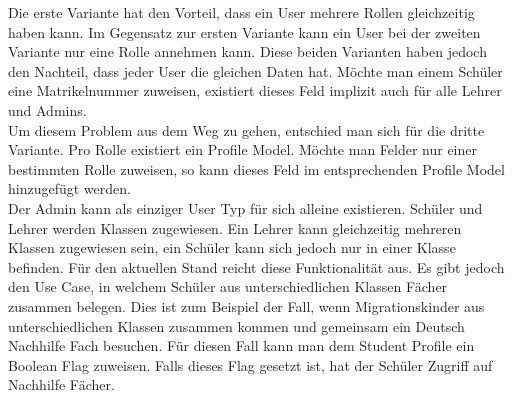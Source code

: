 Die erste Variante hat den Vorteil, dass ein User mehrere Rollen gleichzeitig haben kann. Im Gegensatz zur ersten Variante kann ein User bei der zweiten Variante nur eine Rolle annehmen kann. Diese beiden Varianten haben jedoch den Nachteil, dass jeder User die gleichen Daten hat. Möchte man einem Schüler eine Matrikelnummer zuweisen, existiert dieses Feld implizit auch für alle Lehrer und Admins. \\
Um diesem Problem aus dem Weg zu gehen, entschied man sich für die dritte Variante. Pro Rolle existiert ein Profile Model. Möchte man Felder nur einer bestimmten Rolle zuweisen, so kann dieses Feld im entsprechenden Profile Model hinzugefügt werden. \\
Der Admin kann als einziger User Typ für sich alleine existieren. Schüler und Lehrer werden Klassen zugewiesen. Ein Lehrer kann gleichzeitig mehreren Klassen zugewiesen sein, ein Schüler kann sich jedoch nur in einer Klasse befinden. Für den aktuellen Stand reicht diese Funktionalität aus. Es gibt jedoch den Use Case, in welchem Schüler aus unterschiedlichen Klassen Fächer zusammen belegen. Dies ist zum Beispiel der Fall, wenn Migrationskinder aus unterschiedlichen Klassen zusammen kommen und gemeinsam ein Deutsch Nachhilfe Fach besuchen. Für diesen Fall kann man dem Student Profile ein Boolean Flag zuweisen. Falls dieses Flag gesetzt ist, hat der Schüler Zugriff auf Nachhilfe Fächer.

